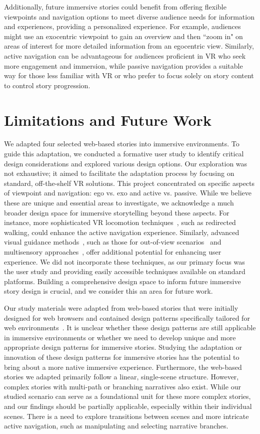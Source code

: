 {Additionally, future immersive stories could benefit from offering flexible viewpoints and navigation options to meet diverse audience needs for information and experiences, providing a personalized experience. 
For example, audiences might use an exocentric viewpoint to gain an overview and then ``zoom in" on areas of interest for more detailed information from an egocentric view. 
Similarly, active navigation can be advantageous for audiences proficient in VR who seek more engagement and immersion, while passive navigation provides a suitable way for those less familiar with VR or who prefer to focus solely on story content to control story progression.}

\section{Limitations and Future Work}
We adapted four selected web-based stories into immersive environments. 
To guide this adaptation, we conducted a formative user study to identify critical design considerations and explored various design options. Our exploration was not exhaustive; it aimed to facilitate the adaptation process by focusing on standard, off-the-shelf VR solutions. 
{This project concentrated on specific aspects of viewpoint and navigation: ego vs. exo and active vs. passive. While we believe these are unique and essential areas to investigate, we acknowledge a much broader design space for immersive storytelling beyond these aspects. 
For instance, more sophisticated VR locomotion techniques~\cite{di2021locomotion}, such as redirected walking, could enhance the active navigation experience.}
Similarly, advanced visual guidance methods~\cite{lange2020hivefive}, such as those for out-of-view scenarios~\cite{petford2019comparison, lin2021labeling} and multisensory approaches~\cite{melo2020multisensory}, offer additional potential for enhancing user experience. 
We did not incorporate these techniques, as our primary focus was the user study and providing easily accessible techniques available on standard platforms. 
Building a comprehensive design space to inform future immersive story design is crucial, and we consider this an area for future work.


Our study materials were adapted from web-based stories that were initially designed for web browsers and contained design patterns specifically tailored for web environments~\cite{bach2018narrative}. 
It is unclear whether these design patterns are still applicable in immersive environments or whether we need to develop unique and more appropriate design patterns for immersive stories. Studying the adaptation or innovation of these design patterns for immersive stories has the potential to bring about a more native immersive experience. 
{Furthermore, the web-based stories we adapted primarily follow a linear, single-scene structure. However, complex stories with multi-path or branching narratives also exist. 
While our studied scenario can serve as a foundational unit for these more complex stories, and our findings should be partially applicable, especially within their individual scenes. There is a need to explore transitions between scenes and more intricate active navigation, such as manipulating and selecting narrative branches.}

